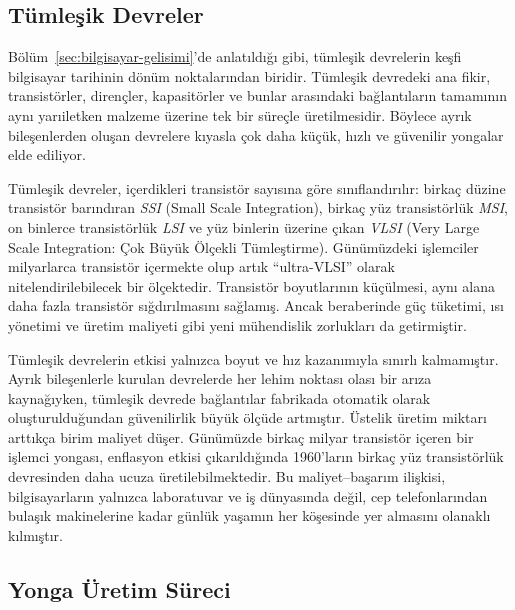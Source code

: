 \subsection{Tümleşik Devreler}
\label{sec:tumlesik-devreler}
Bölüm~\ref{sec:bilgisayar-gelisimi}'de anlatıldığı gibi, tümleşik devrelerin keşfi bilgisayar tarihinin dönüm noktalarından biridir. Tümleşik devredeki ana fikir, transistörler, dirençler, kapasitörler ve bunlar arasındaki bağlantıların tamamının aynı yarıiletken malzeme üzerine tek bir süreçle üretilmesidir. Böylece ayrık bileşenlerden oluşan devrelere kıyasla çok daha küçük, hızlı ve güvenilir yongalar elde ediliyor.

Tümleşik devreler, içerdikleri transistör sayısına göre sınıflandırılır: birkaç düzine transistör barındıran \emph{SSI} (Small Scale Integration), birkaç yüz transistörlük \emph{MSI}, on binlerce transistörlük \emph{LSI} ve yüz binlerin üzerine çıkan \emph{VLSI} (Very Large Scale Integration: Çok Büyük Ölçekli Tümleştirme). Günümüzdeki işlemciler milyarlarca transistör içermekte olup artık ``ultra-VLSI'' olarak nitelendirilebilecek bir ölçektedir. Transistör boyutlarının küçülmesi, aynı alana daha fazla transistör sığdırılmasını sağlamış. Ancak beraberinde güç tüketimi, ısı yönetimi ve üretim maliyeti gibi yeni mühendislik zorlukları da getirmiştir.

Tümleşik devrelerin etkisi yalnızca boyut ve hız kazanımıyla sınırlı kalmamıştır. Ayrık bileşenlerle kurulan devrelerde her lehim noktası olası bir arıza kaynağıyken, tümleşik devrede bağlantılar fabrikada otomatik olarak oluşturulduğundan güvenilirlik büyük ölçüde artmıştır. Üstelik üretim miktarı arttıkça birim maliyet düşer. Günümüzde birkaç milyar transistör içeren bir işlemci yongası, enflasyon etkisi çıkarıldığında 1960'ların birkaç yüz transistörlük devresinden daha ucuza üretilebilmektedir. Bu maliyet--başarım ilişkisi, bilgisayarların yalnızca laboratuvar ve iş dünyasında değil, cep telefonlarından bulaşık makinelerine kadar günlük yaşamın her köşesinde yer almasını olanaklı kılmıştır.

\subsection{Yonga Üretim Süreci}
\label{sec:yonga-uretim-sureci}

